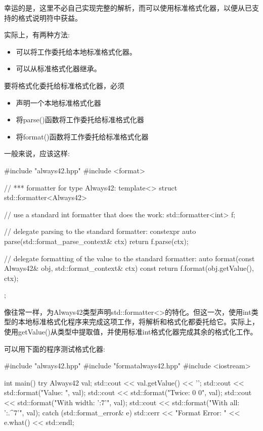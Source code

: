 幸运的是，这里不必自己实现完整的解析，而可以使用标准格式化器，以便从已支持的格式说明符中获益。

实际上，有两种方法:

\begin{itemize}
\item
可以将工作委托给本地标准格式化器。

\item
可以从标准格式化器继承。
\end{itemize}


要将格式化委托给标准格式化器，必须

\begin{itemize}
\item
声明一个本地标准格式化器

\item
将parse()函数将工作委托给标准格式化器

\item
将format()函数将工作委托给标准格式化器
\end{itemize}

一般来说，应该这样:


\begin{cpp}
#include "always42.hpp"
#include <format>

// *** formatter for type Always42:
template<>
struct std::formatter<Always42>
{
	// use a standard int formatter that does the work:
	std::formatter<int> f;

	// delegate parsing to the standard formatter:
	constexpr auto parse(std::format_parse_context& ctx) {
		return f.parse(ctx);
	}

	// delegate formatting of the value to the standard formatter:
	auto format(const Always42& obj, std::format_context& ctx) const {
		return f.format(obj.getValue(), ctx);
	}
};
\end{cpp}

像往常一样，为Always42类型声明std::formatter<>的特化。但这一次，使用int类型的本地标准格式化程序来完成这项工作，将解析和格式化都委托给它。实际上，使用getValue()从类型中提取值，并使用标准int格式化器完成其余的格式化工作。

可以用下面的程序测试格式化器:


\begin{cpp}
#include "always42.hpp"
#include "formatalways42.hpp"
#include <iostream>

int main()
{
	try {
		Always42 val;
		std::cout << val.getValue() << '\n';
		std::cout << std::format("Value: {}\n", val);
		std::cout << std::format("Twice: {0} {0}\n", val);
		std::cout << std::format("With width: '{:7}'\n", val);
		std::cout << std::format("With all: '{:.^7}'\n", val);
	}
	catch (std::format_error& e) {
		std::cerr << "Format Error: " << e.what() << std::endl;
	}
}
\end{cpp}

